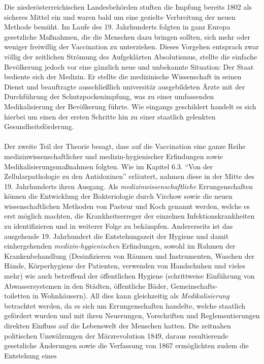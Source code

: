 \documentclass[
    a4paper,
    12pt,
    hyphens,
    chapterprefix=true,
    headheight=33pt,
    footheight=29pt,
    headings=optiontohead, %
]{scrartcl}
\begin{document}
{Die niederösterreichischen Landesbehörden stuften die Impfung bereits 1802 als sicheres Mittel ein und waren bald um eine gezielte Verbreitung der neuen Methode bemüht. Im Laufe des 19. Jahrhunderts folgten in ganz Europa gesetzliche Maßnahmen, die die Menschen dazu bringen sollten, 
sich mehr oder weniger freiwillig der Vaccination zu unterziehen. Dieses 
Vorgehen entsprach zwar völlig der zeitlichen Strömung des Aufgeklärten 
Absolutismus, stellte die einfache Bevölkerung jedoch vor eine gänzlich neue 
und unbekannte Situation: Der Staat bediente sich der Medizin. Er stellte die medizinische 
Wissenschaft in seinen Dienst und beauftragte ausschließlich universitär ausgebildeten Ärzte mit der 
Durchführung der Schutzpockenimpfung, was zu einer umfassenden Medikalisierung der Bevölkerung 
führte. Wie eingangs geschildert handelt es sich hierbei um einen der ersten Schritte hin zu einer 
staatlich gelenkten Gesundheitsförderung.\\
\\
Der zweite Teil der Theorie besagt, dass auf die Vaccination eine ganze Reihe medizinwissenschaftlicher und medizin-hygienischer Erfindungen sowie Medikalisierungsmaßnahmen folgten. Wie im Kapitel 6.3. "`Von der Zellularpathologie zu den Antidoxinen"' erläutert, nahmen diese in der Mitte des 19. Jahrhunderts ihren Ausgang. Als \textit{medizinwissenschaftliche} Errungenschaften können die Entwicklung der Bakteriologie durch Virchow sowie die neuen wissenschaftlichen Methoden von Pasteur und Koch genannt werden, welche es erst möglich machten, die Krankheitserreger der einzelnen Infektionskrankheiten zu identifizieren und in weiterer Folge zu bekämpfen. Andererseits ist das ausgehende 19. Jahrhundert die Entstehungszeit der Hygiene und damit einhergehenden \textit{medizin-hygienischen} Erfindungen, sowohl im Rahmen der Krankenbehandlung (Desinfizieren von Räumen und Instrumenten, Waschen der Hände, Körperhygiene 
der Patienten, verwenden von Handschuhen und vieles mehr) wie auch betreffend der öffentlichen Hygiene (schrittweise Einführung von Abwassersystemen in den Städten, öffentliche Bäder, 
Gemeinschafts-\\toiletten in Wohnhäusern). All dies kann gleichzeitig als \textit{Medikalisierung} betrachtet werden, da es sich um Errungenschaften handelte, welche staatlich gefördert wurden und mit ihren Neuerungen, Vorschriften und Reglementierungen direkten Einfluss auf die Lebenswelt der Menschen hatten. Die zeitnahen politischen Umwälzungen der Märzrevolution 1849, daraus resultierende gesetzliche Änderungen sowie die Verfassung von 1867 ermöglichten zudem die Entstehung eines 
}
\end{document}
